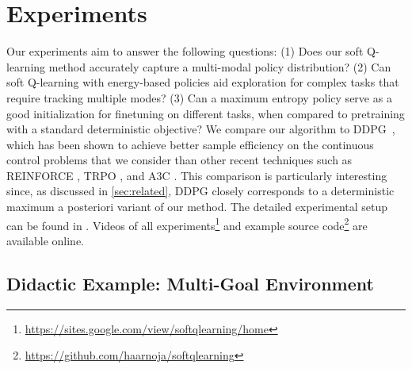 \documentclass{article}
\begin{document}
\vspace{-3mm}
\section{Experiments}
\label{sec:experiments}
\vspace{-2mm}

Our experiments aim to answer the following questions: (1) Does our soft Q-learning method accurately capture a multi-modal policy distribution? (2) Can soft Q-learning with energy-based policies aid exploration for complex tasks that require tracking multiple modes? (3) Can a maximum entropy policy serve as a good initialization for finetuning on different tasks, when compared to pretraining with a standard deterministic objective? We compare our algorithm to DDPG~\cite{lillicrap2015continuous}, which has been shown to achieve better sample efficiency on the continuous control problems that we consider than other recent techniques such as REINFORCE \cite{williams1992simple}, TRPO \cite{schulman2015trust}, and A3C \cite{mnih2016asynchronous}. This comparison is particularly interesting since, as discussed in \autoref{sec:related}, DDPG closely corresponds to a deterministic maximum a posteriori variant of our method.
The detailed experimental setup can be found in . Videos of all experiments\footnote{\href{https://sites.google.com/view/softqlearning/home}{https://sites.google.com/view/softqlearning/home}} and example source code\footnote{\href{https://github.com/haarnoja/softqlearning}{https://github.com/haarnoja/softqlearning}} are available online.

\vspace{-2mm}
\subsection{Didactic Example: Multi-Goal Environment}
\vspace{-1mm}
%
\end{document}
